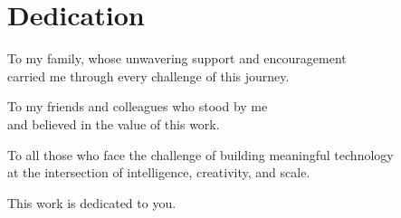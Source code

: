 \chapter*{Dedication}

\vspace{3cm}

\begin{center}
  \itshape

  To my family, whose unwavering support and encouragement\\
  carried me through every challenge of this journey.

  \vspace{1.5cm}

  To my friends and colleagues who stood by me\\
  and believed in the value of this work.

  \vspace{1.5cm}

  To all those who face the challenge of building meaningful technology\\
  at the intersection of intelligence, creativity, and scale.

  \vspace{1.5cm}

  This work is dedicated to you.

\end{center}
